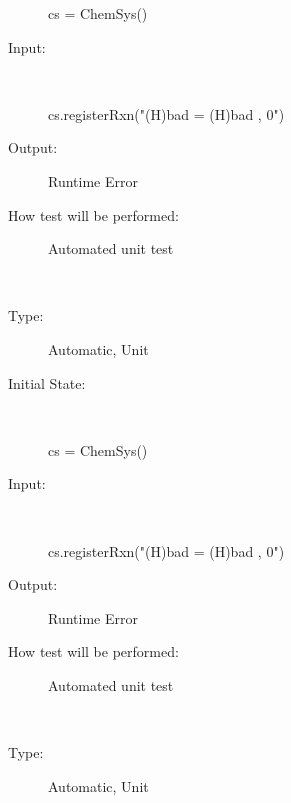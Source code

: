 \documentclass[12pt, titlepage]{article}
\newcounter{testnum} %
\begin{document}
\begin{addmargin}[2em]{0em}
\begin{addmargin}[2em]{0em}
\begin{description}
\begin{python}
cs = ChemSys()
\end{python}
\newpage					
\item[Input:] ~\newline

\begin{python}
cs.registerRxn("(H)bad = (H)bad , 0") 
\end{python}
					
\item[Output:] Runtime Error
					
\item[How test will be performed:] Automated unit test\\
\end{description}
\end{addmargin}


\\
\begin{addmargin}[2em]{0em}
\begin{description}
\item[Type:] Automatic, Unit
					
\item[Initial State:] ~\newline

\begin{python}
cs = ChemSys()
\end{python}
					
\item[Input:] ~\newline

\begin{python}
cs.registerRxn("(H)bad = (H)bad , 0") 
\end{python}
					
\item[Output:] Runtime Error
					
\item[How test will be performed:] Automated unit test\\
\end{description}
\end{addmargin}


\\
\begin{addmargin}[2em]{0em}
\begin{description}
\item[Type:] Automatic, Unit
					

\end{description}
\end{addmargin}
\end{addmargin}
\end{document}
